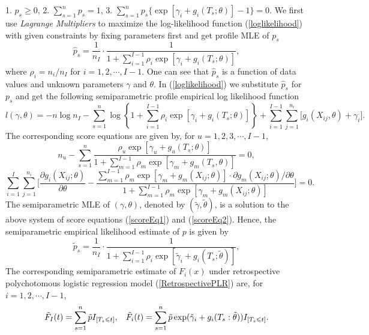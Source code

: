 \documentclass[11pt]{article}
\def\le{\leqslant}
\def\ge{\geqslant}
\theoremstyle{plain}
\theoremstyle{definition}
\theoremstyle{remark}
\theoremstyle{definition}
\begin{document}
1.\hspace{3mm} $p_s \ge 0$, \hspace{3mm} 2.\hspace{3mm} $\sum_{s=1}^n p_s=1$,\hspace{3mm} 3.\hspace{3mm} $\sum_{s=1}^n p_s\big\{\exp[\gamma_i+g_i(T_s;\theta)]-1 \big\}=0$.
We first use {\em Lagrange Multipliers} to maximize the log-likelihood function (\ref{loglikelihood}) with given
constraints by fixing parameters first and get profile MLE of $p_s$
\begin{equation}
\hat{p}_s=\frac{1}{n_I}\cdot\frac{1}{1+\sum_{i=1}^{I-1}\rho_i\exp[\gamma_i+ g_i(T_s;\theta)]},\label{p_mle}
\end{equation}
where $\rho_i=n_i/n_I$ for $i=1,2, \cdots, I-1$. One can see that $\hat{p}_s$ is a function of data values and unknown parameters $\gamma$ and $\theta$. In (\ref{loglikelihood}) we substitute $\hat{p}_s$ for $p_s$ and get the following semiparametric profile empirical log likelihood function
$$l(\gamma,\theta)=-n\log n_I-\sum_{s=1}^n\log\left\{1+\sum_{i=1}^{I-1}\rho_i\exp[\gamma_i+
g_i(T_s; \theta)]\right\}+\sum_{i=1}^{I-1}\sum_{j=1}^{n_i}\Big[  g_i(X_{ij}, \theta) + \gamma_i \Big]. \label{parloglik}
$$
The corresponding score equations are given by, for $u=1, 2, 3,\cdots, I-1$,
\begin{equation}
n_u -\sum_{s=1}^n \frac{\rho_u\exp[\gamma_u+g_u(T_s;\theta)]} {1+\sum_{m=1}^{I-1}\rho_m\exp[\gamma_m+g_m(T_s,\theta)]}=0,
\label{scoreEq1}
\end{equation}
\begin{equation}
\sum_{i=1}^{I}\sum_{j=1}^{n_i}\Big[ \frac{\partial g_i(X_{ij};\theta)}{\partial
\theta}-\frac{\sum_{m=1}^{I-1}\rho_m\exp[\gamma_m+g_m(X_{ij};\theta)]\cdot
\partial g_m(X_{ij};\theta)/\partial\theta}{1+\sum_{m=1}^{I-1}\rho_m\exp[\gamma_m
+g_m(X_{ij};\theta)]} \Big]=0 .  \label{scoreEq2}
\end{equation}
The semiparametric MLE of $(\gamma, \theta)$, denoted by $(\tilde{\gamma}, \tilde{\theta})$, is a solution to the above system of score equations (\ref{scoreEq1}) and (\ref{scoreEq2}). Hence, the semiparametric empirical likelihood estimate of $p$ is given by
\begin{equation}
\tilde{p}_s=\frac{1}{n_I}\cdot\frac{1}{1+\sum_{i=1}^{I-1}\rho_i\exp[\tilde{\gamma}_i+ g_i(T_s;\tilde{\theta})]},\label{p_el_mle}
\end{equation}
The corresponding semiparametric estimate of $F_i(x)$ under retrospective polychotomous logistic regression model (\ref{RetrospectivePLR}) are, for $i=1, 2, \cdots, I-1$,
\begin{equation}
\tilde{F}_I(t)=\sum_{s=1}^n\tilde{p}I_{[T_s\le t]},\hspace{3mm}\tilde{F}_i(t)=\sum_{s=1}^n\tilde{p}\exp(\tilde{\gamma}_i+g_i(T_s:\tilde{\theta}))I_{[T_s\le t]}. \label{ELMLE_F_i}
\end{equation}
\end{document}
